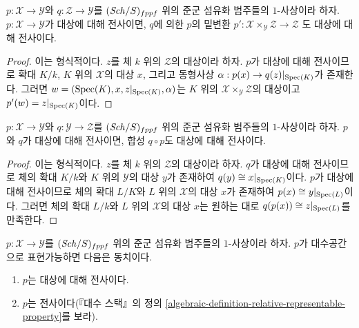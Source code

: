 \begin{lemma}
\label{lemma-base-change-surjective}
$p : \mathcal{X} \to \mathcal{Y}$와 $q : \mathcal{Z} \to \mathcal{Y}$를
$(\mathit{Sch}/S)_{fppf}$ 위의 준군 섬유화 범주들의 $1$-사상이라 하자.
$p : \mathcal{X} \to \mathcal{Y}$가 대상에 대해 전사이면,
$q$에 의한 $p$의 밑변환
$p' : \mathcal{X} \times_\mathcal{Y} \mathcal{Z} \to \mathcal{Z}$
도 대상에 대해 전사이다.
\end{lemma}

\begin{proof}
이는 형식적이다. $z$를 체 $k$ 위의 $\mathcal{Z}$의 대상이라 하자.
$p$가 대상에 대해 전사이므로 확대 $K/k$, $K$ 위의
$\mathcal{X}$의 대상 $x$, 그리고 동형사상
$\alpha : p(x) \to q(z)|_{\mathop{\mathrm{Spec}}(K)}$가 존재한다. 그러면
$w = (\mathop{\mathrm{Spec}}(K), x, z|_{\mathop{\mathrm{Spec}}(K)}, \alpha)$는 $K$ 위의
$\mathcal{X} \times_\mathcal{Y} \mathcal{Z}$의 대상이고
$p'(w) = z|_{\mathop{\mathrm{Spec}}(K)}$이다.
\end{proof}

\begin{lemma}
\label{lemma-composition-surjective}
$p : \mathcal{X} \to \mathcal{Y}$와 $q : \mathcal{Y} \to \mathcal{Z}$를
$(\mathit{Sch}/S)_{fppf}$ 위의 준군 섬유화 범주들의 $1$-사상이라 하자.
$p$와 $q$가 대상에 대해 전사이면, 합성 $q \circ p$도
대상에 대해 전사이다.
\end{lemma}

\begin{proof}
이는 형식적이다. $z$를 체 $k$ 위의 $\mathcal{Z}$의 대상이라 하자.
$q$가 대상에 대해 전사이므로 체의 확대 $K/k$와 $K$ 위의
$\mathcal{Y}$의 대상 $y$가 존재하여
$q(y) \cong x|_{\mathop{\mathrm{Spec}}(K)}$이다. $p$가 대상에 대해 전사이므로
체의 확대 $L/K$와 $L$ 위의 $\mathcal{X}$의 대상 $x$가 존재하여
$p(x) \cong y|_{\mathop{\mathrm{Spec}}(L)}$이다. 그러면 체의 확대 $L/k$와
$L$ 위의 $\mathcal{X}$의 대상 $x$는 원하는 대로
$q(p(x)) \cong z|_{\mathop{\mathrm{Spec}}(L)}$를 만족한다.
\end{proof}

\begin{lemma}
\label{lemma-representable-by-spaces-surjective}
$p : \mathcal{X} \to \mathcal{Y}$를 $(\mathit{Sch}/S)_{fppf}$ 위의
준군 섬유화 범주들의 $1$-사상이라 하자. $p$가 대수공간으로
표현가능하면 다음은 동치이다.
\begin{enumerate}
\item $p$는 대상에 대해 전사이다.
\item $p$는 전사이다(『대수 스택』의 정의
\ref{algebraic-definition-relative-representable-property}를 보라).
\end{enumerate}
\end{lemma}

